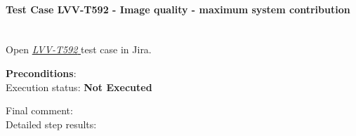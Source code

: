 \documentclass[DM,lsstdraft,STR,toc]{lsstdoc}
\begin{document}
    \paragraph{Test Case LVV-T592 - Image quality - maximum system contribution
 }\mbox{}\\

Open  \href{https://jira.lsstcorp.org/secure/Tests.jspa#/testCase/LVV-T592}{\textit{ LVV-T592 } }
test case in Jira.

    

    \textbf{ Preconditions}:\\
    

    Execution status: {\bf Not Executed }

    Final comment:\\


    Detailed step results:
\end{document}
